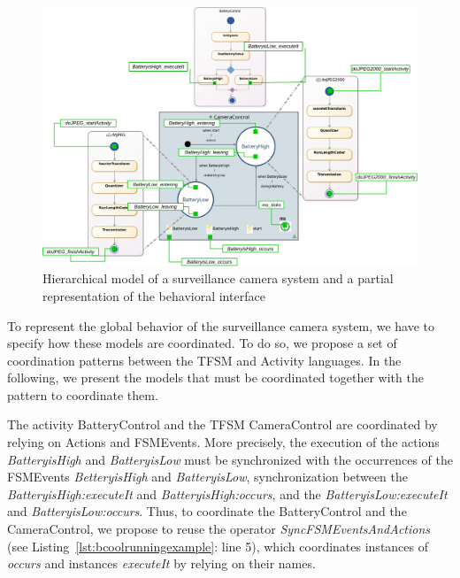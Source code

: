 \begin{figure}
	\center
	\includegraphics[width=1\columnwidth]{examples/figs/picmodels.pdf}
	\caption{Hierarchical model of a surveillance camera system and a partial representation of the behavioral interface}
	\label{fig:camerasystem}
\end{figure}

To represent the global behavior of the surveillance camera system, we have to specify how these models are coordinated. To do so, we propose a set of coordination patterns between the TFSM and Activity languages. In the following, we present the models that must be coordinated together with the pattern to coordinate them. 

The activity BatteryControl and the TFSM CameraControl are coordinated by relying on Actions and FSMEvents. More precisely, the execution of the actions \emph{BatteryisHigh} and \emph{BatteryisLow} must be synchronized with the occurrences of the FSMEvents \emph{BetteryisHigh} and \emph{BatteryisLow}, \ie synchronization between the \mse \emph{BatteryisHigh:executeIt} and \emph{BatteryisHigh:occurs}, and the \mse \emph{BatteryisLow:executeIt} and \emph{BatteryisLow:occurs}. Thus, to coordinate the BatteryControl and the CameraControl, we propose to reuse the operator \emph{SyncFSMEventsAndActions} (see Listing~\ref{lst:bcoolrunningexample}: line 5), which coordinates instances of \dse \emph{occurs} and instances \dse \emph{executeIt} by relying on their names. 

